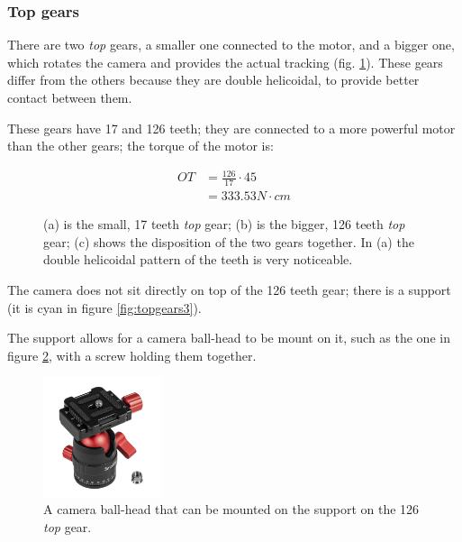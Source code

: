 \documentclass[]{article}
\newcommand{\inctrimpic}[2][1]
{\texttt{[image: \#2]}}
\begin{document}
\subsubsection{Top gears}


There are two \textit{top} gears, a smaller one connected to the motor, and a bigger one, which rotates the camera and provides the actual tracking (fig. \ref{fig:topgears}). These gears differ from the others because they are double helicoidal, to provide better contact between them. 

These gears have 17 and 126 teeth; they are connected to a more powerful motor than the other gears; the torque of the motor is:

\begin{align*}
	OT & = \frac{126}{17}\cdot 45 \\
	& = 333.53 N\cdot cm
\end{align*}

\begin{figure}[H]
	\centering
	\subfigure[]{\inctrimpic[0.45]{images/motors/mot_top_gear_17.pdf}\label{fig:topgears1}}
	\subfigure[]{
		\inctrimpic[0.45]{images/motors/mot_top_gear_126.pdf}\label{fig:topgears2}
		}
	\subfigure[]{\inctrimpic[0.6]{images/motors/mot_top_gears.pdf}\label{fig:topgears3}}
	\caption{(a) is the small, 17 teeth \textit{top} gear; (b) is the bigger, 126 teeth \textit{top} gear; (c) shows the disposition of the two gears together. In (a) the double helicoidal pattern of the teeth is very noticeable.}
	\label{fig:topgears}
\end{figure}

The camera does not sit directly on top of the 126 teeth gear; there is a support (it is cyan in figure \ref{fig:topgears3}).

The support allows for a camera ball-head to be mount on it, such as the one in figure \ref{fig:camerahead}, with a screw holding them together.


\begin{figure}[h]
	\centering
	\includegraphics[width=3.5cm]{images/motors/camballhead.jpg}
	\caption{A camera ball-head that can be mounted on the support on the 126 \textit{top} gear.}
	\label{fig:camerahead}

\end{figure}
\end{document}
